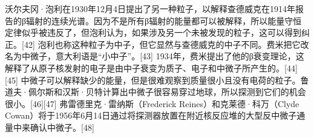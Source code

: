 沃尔夫冈·泡利在1930年12月4日提出了另一种粒子，以解释查德威克在1914年报告的β辐射的连续光谱。因为不是所有β辐射的能量都可以被解释，所以能量守恒定律似乎被违反了，但泡利认为，如果涉及另一个未被发现的粒子，这可以得到纠正。[42] 泡利也称这种粒子为中子，但它显然与查德威克的中子不同。费米把它改名为中微子，意大利语是“小中子”。[43] 1934年，费米提出了他的β衰变理论，这解释了从原子核发射的电子是由中子衰变为质子、电子和中微子所产生的。[44][45] 中微子可以解释缺少的能量，但是很难观察到质量很小且没有电荷的粒子。鲁道夫·佩尔斯和汉斯·贝特计算出中微子很容易穿过地球，所以探测到它们的机会很小。[46][47] 弗雷德里克·雷纳斯（Frederick Reines）和克莱德·科万（Clyde Cowan）将于1956年6月14日通过将探测器放置在附近核反应堆的大型反中微子通量中来确认中微子。[48]